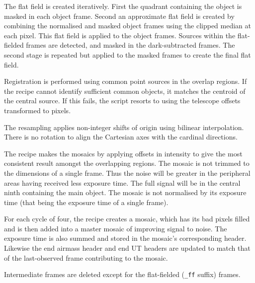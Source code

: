 \documentclass[twoside,11pt,nolof]{starlink}
\begin{document}
{{{         \sstitem
         The flat field is created iteratively.  First the quadrant
         containing the object is masked in each object frame.  Second an
         approximate flat field is created by combining the normalised
         and masked object frames using the clipped median at each pixel.
         This flat field is applied to the object frames.  Sources within
         the flat-fielded frames are detected, and masked in the
         dark-subtracted frames.  The second stage is repeated but applied
         to the masked frames to create the final flat field.

         \sstitem
         Registration is performed using common point sources in the
         overlap regions.  If the recipe cannot identify sufficient common
         objects, it matches the centroid of the central source.  If this
         fails, the script resorts to using the telescope offsets
         transformed to pixels.

         \sstitem
         The resampling applies non-integer shifts of origin using
         bilinear interpolation.  There is no rotation to align the
         Cartesian axes with the cardinal directions.

         \sstitem
         The recipe makes the mosaics by applying offsets in intensity
         to give the most consistent result amongst the overlapping regions.
         The mosaic is not trimmed to the dimensions of a single frame.  Thus
         the noise will be greater in the peripheral areas having received
         less exposure time.  The full signal will be in the central ninth
         containing the main object.  The mosaic is not normalised by its
         exposure time (that being the exposure time of a single frame).

         \sstitem
         For each cycle of four, the recipe creates a mosaic, which has
         its bad pixels filled and is then added into a master mosaic of
         improving signal to noise.  The exposure time is also summed and
         stored in the mosaic's corresponding header.  Likewise the end
         airmass header and end UT headers are updated to match that of
         the last-observed frame contributing to the mosaic.

         \sstitem
         Intermediate frames are deleted except for the flat-fielded ({\tt\_ff}
         suffix) frames.
      }
   }
   }
\end{document}
